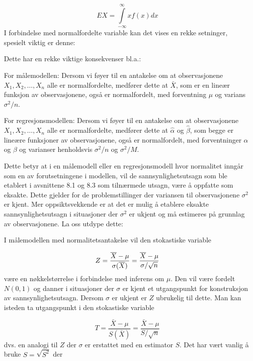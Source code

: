 \[EX=\int \limits_{-\infty}^{\infty} x f(x)dx \]
I forbindelse med normalfordelte variable kan det vises en rekke
setninger, spesielt viktig er denne:

\begin{center}   \end{center}
Dette har en rekke viktige konsekvenser bl.a.:

For målemodellen: Dersom vi føyer til en antakelse om at
observasjonene $X_1,X_2,\ldots ,X_n$ alle er normalfordelte,
medfører dette at $\bar X$, som er en lineær funksjon av
observasjonene, også er normalfordelt, med forventning $\mu$
og varians $\sigma ^2/n$. 

For regresjonsmodellen: Dersom vi føyer til en antakelse om at
observasjonene $X_1,X_2,\ldots ,X_n$ alle er normalfordelte,
medfører dette at $\hat\alpha$ og $\hat\beta$, som begge er
lineære funksjoner av observasjonene, også er
normalfordelt, med forventninger $\alpha$ og $\beta$ og varianser
henholdsvis $\sigma ^2/n$ og $\sigma ^2/M$.

Dette betyr at i en målemodell eller en regresjonsmodell hvor
normalitet inngår som en av forutsetningene i modellen, vil de
sannsynlighetsutsagn som ble etablert i avsnittene 8.1 og 8.3 som
tilnærmede utsagn, være å oppfatte som eksakte. Dette
gjelder for de problemstillinger der variansen til observasjonene
$\sigma ^2$ er kjent. Mer oppsiktsvekkende er at det er mulig
å etablere eksakte sannsynlighetsutsagn i
situasjoner der $\sigma ^2$ er ukjent og må estimeres på
grunnlag av observasjonene. La oss utdype dette:

I målemodellen med normalitetsantakelse vil den stokastiske
variable

     \[Z={\bar X - \mu \over \sigma (\bar X)}={\bar X -\mu
     \over \sigma/ \sqrt n}\]
være en nøkkelstørrelse i forbindelse med inferens om
$\mu$. Den vil være fordelt $N(0,1)$ og danner i situasjoner
der $\sigma$ er kjent et utgangspunkt for konstruksjon av
sannsynlighetsutsagn. Dersom $\sigma$ er ukjent er $Z$ ubrukelig
til dette. Man kan isteden ta utgangspunkt i den stokastiske variable 

\[T=\frac{\bar X - \mu}{S(\bar X)}=\frac{\bar X -\mu}{S/ \sqrt{n}}\]
dvs. en analogi til $Z$ der $\sigma$ er erstattet med en
estimator $S$. Det har vært vanlig å bruke $S=\sqrt{S^2}$ der


